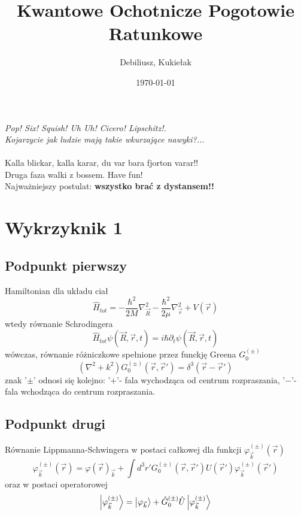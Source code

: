 \documentclass[a4paper,12pt]{article}
\title{Kwantowe Ochotnicze Pogotowie Ratunkowe} %
\author{Debiliusz, Kukiełak} %
\date{\today} %
\begin{document}
	\maketitle
    \textit{Pop! Six!  Squish! Uh Uh! Cicero! Lipschitz!. \\
   	Kojarzycie jak ludzie mają takie wkurzające nawyki?...}\\\\
   	Kalla blickar, kalla karar, du var bara fjorton varar!!\\
   	Druga faza walki z bossem. Have fun!\\
    Najważniejszy postulat: \textbf{wszystko brać z dystansem!!}
    \newpage
    \tableofcontents
    
    \section{Wykrzyknik 1}
    	\subsection{Podpunkt pierwszy}
    		Hamiltonian dla układu ciał
    		$$
    			\hat{H}_{tot} = -\frac{\hbar^2}{2M}\nabla^2_{\vec{R}}-\frac{\hbar^2}{2\mu}\nabla^2_{\vec{r}} + V(\vec{r})
    		$$
    		wtedy równanie Schrodingera
    		$$
    			\hat{H}_{tot}\psi(\vec{R},\vec{r},t) =i\hbar\partial_t\psi(\vec{R},\vec{r},t)
    		$$
    		wówczas, równanie różniczkowe spełnione przez funckję Greena $G_0^{(\pm)}$
    		$$
    			\left(\nabla^2+k^2\right)G_0^{(\pm)}(\vec{r},\vec{r}') = \delta^3(\vec{r}-\vec{r}')
    		$$
    		znak '$\pm$' odnosi się kolejno: '$+$'- fala wychodząca od centrum rozpraszania, '$-$'- fala wchodząca do centrum rozpraszania.
    	\subsection{Podpunkt drugi}
    		Równanie Lippmanna-Schwingera w postaci całkowej dla funkcji $\varphi^{(\pm)}_{\vec{k}}(\vec{r})$
    		$$
    			\varphi^{(\pm)}_{\vec{k}}(\vec{r}) = \varphi(\vec{r})_{\vec{k}}+\int d^3r' G_0^{(\pm)}(\vec{r},\vec{r}')U(\vec{r}')\varphi^{(\pm)}_{\vec{k}}(\vec{r}')
    		$$
    		oraz w postaci operatorowej 
    		$$
	    			\ket{\varphi^{(\pm)}_{\vec{k}}} =\ket{\varphi_{\vec{k}}} +\hat{G}_0^{(\pm)}\hat{U}\ket{\varphi^{(\pm)}_{\vec{k}}} 
    		$$
\end{document}
